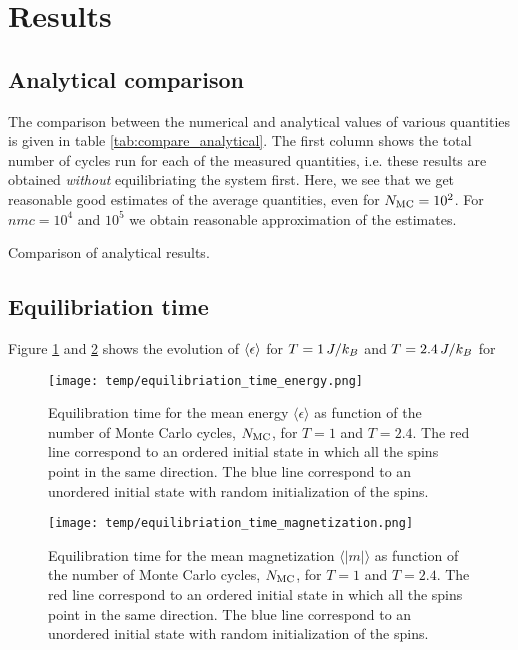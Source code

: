 \section{Results}\label{sec:results}
\subsection{Analytical comparison}\label{subsec_results:analytical}
The comparison between the numerical and analytical values of various quantities is given in table \ref{tab:compare_analytical}. The first column shows the total number of cycles run for each of the measured quantities, i.e. these results are obtained \textit{without} equilibriating the system first. Here, we see that we get reasonable good estimates of the average quantities, even for $N_\mathrm{MC}=10^2$. For $nmc=10^4$ and $10^5$ we obtain reasonable approximation of the estimates.  

\begin{table}[!ht]
    
    \caption{Comparison of analytical results. }
    \label{tab:compare_analytical}
\end{table}


\subsection{Equilibriation time}\label{subsec_results:equilibriation_time}
Figure \ref{fig:equil_energy} and \ref{fig:equil_magn} shows the evolution of $\expval{\epsilon}$ for $T=1\,J/k_B$ and $T=2.4\,J/k_B$ for 
\begin{figure}[!ht]
    \texttt{[image: temp/equilibriation\_time\_energy.png]}
    \caption{Equilibration time for the mean energy $\langle \epsilon \rangle$ as function of the number of Monte Carlo cycles, $N_\mathrm{MC}$, for $T=1$ and $T=2.4$. The red line correspond to an ordered initial state in which all the spins point in the same direction. The blue line correspond to an unordered initial state with random initialization of the spins.}

    \label{fig:equil_energy}
\end{figure}



\begin{figure}[!ht]
    \texttt{[image: temp/equilibriation\_time\_magnetization.png]}
    \caption{Equilibration time for the mean magnetization $\langle \vert m \vert \rangle$ as function of the number of Monte Carlo cycles, $N_\mathrm{MC}$, for $T=1$ and $T=2.4$. The red line correspond to an ordered initial state in which all the spins point in the same direction. The blue line correspond to an unordered initial state with random initialization of the spins.}
    \label{fig:equil_magn}
\end{figure}



